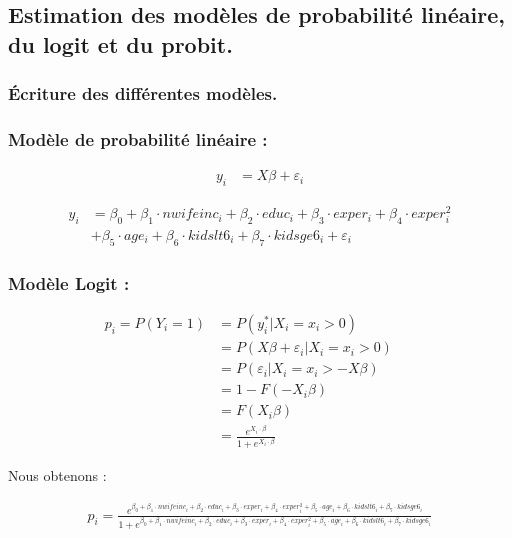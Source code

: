 \subsection{Estimation des modèles de probabilité linéaire, du logit et du probit.}

\subsubsection{Écriture des différentes modèles.}

\subsubsection*{Modèle de probabilité linéaire :} 

\begin{align}
    y_i &= X \beta + \varepsilon_i \nonumber
\end{align}

\begin{align}
    y_i &=  \beta_0 + \beta_1 \cdot nwifeinc_i + \beta_2 \cdot educ_i + \beta_3 \nonumber \cdot exper_i + \beta_4 \cdot exper_i^2 \\ 
    & + \beta_5 \cdot age_i + \beta_6 \cdot kidslt6_i + \beta_7 \cdot kidsge6_i + \varepsilon_i \nonumber
\end{align}

\subsubsection*{Modèle Logit :} 

\begin{align}
    p_i = P(Y_i = 1) &= P(y_i^* | X_i = x_i > 0) \nonumber  \\ 
               &=  P(X \beta + \varepsilon_i | X_i = x_i > 0 ) \nonumber  \\ 
               &= P(\varepsilon_i | X_i = x_i > - X \beta) \nonumber && \\ 
               &= 1 - F(- X_i \beta) \nonumber && \\
               &= F(X_i \beta) \nonumber && \\ 
               &=  \frac{e^{X_i \cdot \beta}}{1 + e^{X_i \cdot \beta}}  
\end{align}

Nous obtenons : 

\begin{align}
    p_i = \frac{e^{\beta_0 + \beta_1 \cdot nwifeinc_i + \beta_2 \cdot educ_i + \beta_3 \cdot exper_i + \beta_4 \cdot exper_i^2 + \beta_5 \cdot age_i + \beta_6 \cdot kidslt6_i + \beta_7 \cdot kidsge6_i}}{1 + e^{\beta_0 + \beta_1 \cdot nwifeinc_i + \beta_2 \cdot educ_i + \beta_3 \cdot exper_i + \beta_4 \cdot exper_i^2 + \beta_5 \cdot age_i + \beta_6 \cdot kidslt6_i + \beta_7 \cdot kidsge6_i}}
\end{align}

